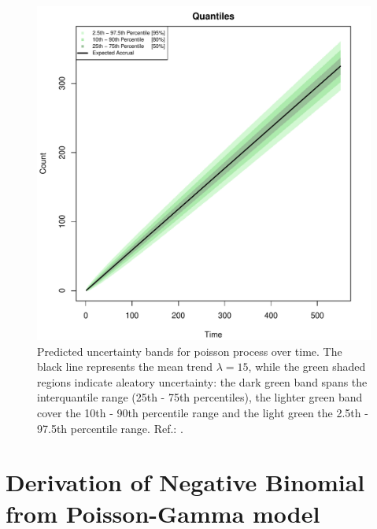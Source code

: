 \begin{figure}
\begin{knitrout}
\color{fgcolor}

{\centering \includegraphics[width=\textwidth-3cm]{figure/ch02_figunnamed-chunk-6-1} 

}


\end{knitrout}
  \caption{Predicted uncertainty bands for poisson process over time. The black line represents the mean trend $\lambda = 15$, while the green shaded regions indicate aleatory uncertainty: the dark green band spans the interquantile range (25th - 75th percentiles), the lighter green band cover the 10th - 90th percentile range and the light green the 2.5th - 97.5th percentile range. Ref.: \cite{spiegelhalter2011visualizing}.}
  \label{fig:2_5}
\end{figure}


\section{Derivation of Negative Binomial from Poisson-Gamma model}

